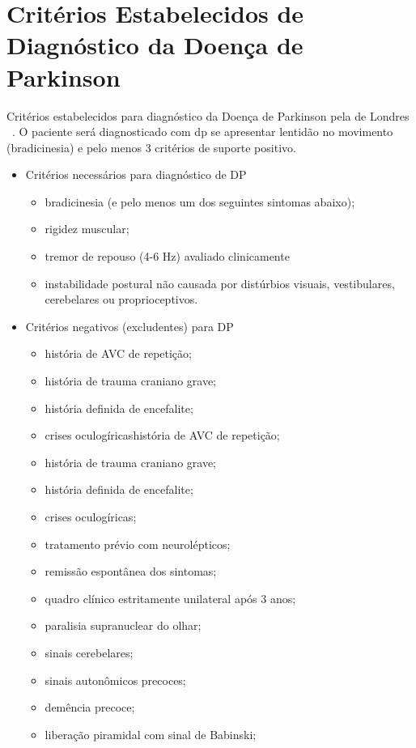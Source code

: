 \chapter{Critérios Estabelecidos de Diagnóstico da Doença de Parkinson} \label{apendice:diagnostico_parkinson}
Critérios estabelecidos para diagnóstico da Doença de Parkinson pela  de Londres ~\cite{national2006parkinson}. O paciente será diagnosticado com \ac{dp} se apresentar lentidão no movimento (bradicinesia) e pelo menos 3 critérios de suporte positivo.
\begin{itemize}
	\item Critérios necessários para diagnóstico de DP	
		\begin{itemize}
			\item bradicinesia (e pelo menos um dos seguintes sintomas abaixo);
			\item rigidez muscular;
			\item tremor de repouso (4-6 Hz) avaliado clinicamente
			\item instabilidade postural não causada por distúrbios visuais, vestibulares, cerebelares ou proprioceptivos.
		\end{itemize}
	\item Critérios negativos (excludentes) para DP
		\begin{itemize}
			\item história de AVC de repetição;
			\item história de trauma craniano grave;
			\item história definida de encefalite;
			\item crises oculogíricashistória de AVC de repetição;
			\item história de trauma craniano grave;
			\item história definida de encefalite;
			\item crises oculogíricas;
			\item tratamento prévio com neurolépticos;
			\item remissão espontânea dos sintomas;
			\item quadro clínico estritamente unilateral após 3 anos;
			\item paralisia supranuclear do olhar;
			\item sinais cerebelares;
			\item sinais autonômicos precoces;
			\item demência precoce;
			\item liberação piramidal com sinal de Babinski;

\end{itemize}
\end{itemize}
